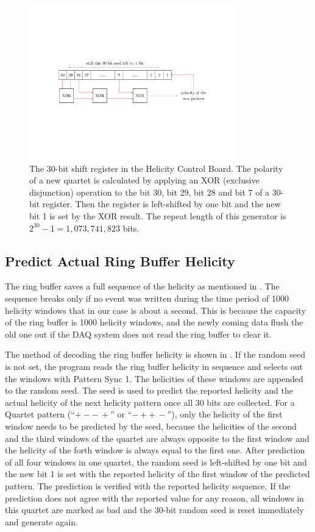 \begin{figure}[b!]
  \centering
  \includegraphics[width=0.8\textwidth]{figs/helicity-pseudo-random.pdf}
  \caption[The pseudo-random generator of the helicity signal.]{The 30-bit shift register in the Helicity Control Board. The polarity of a new quartet is calculated by applying an XOR (exclusive disjunction) operation to the bit 30, bit 29, bit 28 and bit 7 of a 30-bit register. Then the register is left-shifted by one bit and the new bit 1 is set by the XOR result. The repeat length of this generator is $2^{30} - 1 = 1,073,741,823$ bits. \label{A1S2F1}}
\end{figure}

\subsection{Predict Actual Ring Buffer Helicity}
\label{A1S2SS1}

The ring buffer saves a full sequence of the helicity as mentioned in . The sequence breaks only if no event was written during the time period of 1000 helicity windows that in our case is about a second. This is because the capacity of the ring buffer is 1000 helicity windows, and the newly coming data flush the old one out if the DAQ system does not read the ring buffer to clear it.

The method of decoding the ring buffer helicity is shown in . If the random seed is not set, the program reads the ring buffer helicity in sequence and selects out the windows with Pattern Sync 1. The helicities of these windows are appended to the random seed. The seed is used to predict the reported helicity and the actual helicity of the next helicity pattern once all 30 bits are collected. For a Quartet pattern (``$+--\,+$'' or ``$-++\,-$''), only the helicity of the first window needs to be predicted by the seed, because the helicities of the second and the third windows of the quartet are always opposite to the first window and the helicity of the forth window is always equal to the first one. After prediction of all four windows in one quartet, the random seed is left-shifted by one bit and the new bit 1 is set with the reported helicity of the first window of the predicted pattern. The prediction is verified with the reported helicity sequence. If the prediction does not agree with the reported value for any reason, all windows in this quartet are marked as bad and the 30-bit random seed is reset immediately and generate again.

